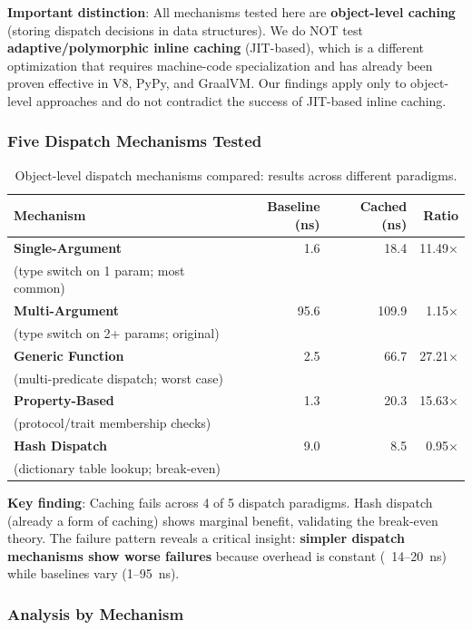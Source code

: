 \documentclass[sigplan,final]{acmart}
\begin{document}
\textbf{Important distinction}: All mechanisms tested here are \textbf{object-level caching} (storing
dispatch decisions in data structures). We do NOT test \textbf{adaptive/polymorphic inline caching}
(JIT-based), which is a different optimization that requires machine-code specialization and has
already been proven effective in V8, PyPy, and GraalVM. Our findings apply only to object-level
approaches and do not contradict the success of JIT-based inline caching.

\subsubsection{Five Dispatch Mechanisms Tested}

\begin{table}[h]
\centering
\caption{Object-level dispatch mechanisms compared: results across different paradigms.}
\label{tab:mechanisms}
\begin{tabular}{@{}lrrr@{}}
\toprule
\textbf{Mechanism} & \textbf{Baseline (ns)} & \textbf{Cached (ns)} & \textbf{Ratio} \\
\midrule
\textbf{Single-Argument} & 1.6 & 18.4 & 11.49× \\
\quad (type switch on 1 param; most common) \\
\textbf{Multi-Argument} & 95.6 & 109.9 & 1.15× \\
\quad (type switch on 2+ params; original) \\
\textbf{Generic Function} & 2.5 & 66.7 & 27.21× \\
\quad (multi-predicate dispatch; worst case) \\
\textbf{Property-Based} & 1.3 & 20.3 & 15.63× \\
\quad (protocol/trait membership checks) \\
\textbf{Hash Dispatch} & 9.0 & 8.5 & 0.95× \\
\quad (dictionary table lookup; break-even) \\
\bottomrule
\end{tabular}
\end{table}

\textbf{Key finding}: Caching fails across 4 of 5 dispatch paradigms. Hash dispatch (already a form
of caching) shows marginal benefit, validating the break-even theory. The failure pattern reveals a
critical insight: \textbf{simpler dispatch mechanisms show worse failures} because overhead is
constant (~14--20~ns) while baselines vary (1--95~ns).

\subsubsection{Analysis by Mechanism}
\end{document}
